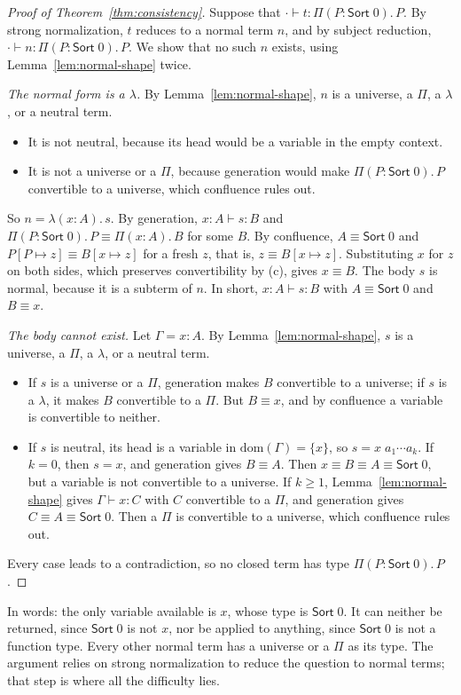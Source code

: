 \documentclass[acmsmall,screen,nonacm]{acmart}
\newcommand{\Sort}[1]{\mathsf{Sort}\;#1}
\newcommand{\tPi}[3]{\Pi(#1{:}#2).\,#3}
\newcommand{\tLam}[3]{\lambda(#1{:}#2).\,#3}
\newcommand{\subst}[3]{#1[#2 \mapsto #3]}
\newcommand{\dom}{\mathrm{dom}}
\newcommand{\conv}{\equiv}
\begin{document}
\begin{proof}[Proof of Theorem~\ref{thm:consistency}]
Suppose that $\cdot \vdash t : \tPi{P}{\Sort{0}}{P}$.
By strong normalization, $t$ reduces to a normal term $n$, and by subject reduction, $\cdot \vdash n : \tPi{P}{\Sort{0}}{P}$.
We show that no such $n$ exists, using Lemma~\ref{lem:normal-shape} twice.

\emph{The normal form is a $\lambda$.}
By Lemma~\ref{lem:normal-shape}, $n$ is a universe, a $\Pi$, a $\lambda$, or a neutral term.
\begin{itemize}
  \item It is not neutral, because its head would be a variable in the empty context.
  \item It is not a universe or a $\Pi$, because generation would make $\tPi{P}{\Sort{0}}{P}$ convertible to a universe, which confluence rules out.
\end{itemize}
So $n = \tLam{x}{A}{s}$.
By generation, $x : A \vdash s : B$ and $\tPi{P}{\Sort{0}}{P} \conv \tPi{x}{A}{B}$ for some $B$.
By confluence, $A \conv \Sort{0}$ and $\subst{P}{P}{z} \conv \subst{B}{x}{z}$ for a fresh $z$, that is, $z \conv \subst{B}{x}{z}$.
Substituting $x$ for $z$ on both sides, which preserves convertibility by (c), gives $x \conv B$.
The body $s$ is normal, because it is a subterm of $n$.
In short, $x : A \vdash s : B$ with $A \conv \Sort{0}$ and $B \conv x$.

\emph{The body cannot exist.}
Let $\Gamma = x : A$. By Lemma~\ref{lem:normal-shape}, $s$ is a universe, a $\Pi$, a $\lambda$, or a neutral term.
\begin{itemize}
  \item If $s$ is a universe or a $\Pi$, generation makes $B$ convertible to a universe; if $s$ is a $\lambda$, it makes $B$ convertible to a $\Pi$.
    But $B \conv x$, and by confluence a variable is convertible to neither.
  \item If $s$ is neutral, its head is a variable in $\dom(\Gamma) = \{x\}$, so $s = x\;a_1 \cdots a_k$.
    If $k = 0$, then $s = x$, and generation gives $B \conv A$. Then $x \conv B \conv A \conv \Sort{0}$, but a variable is not convertible to a universe.
    If $k \ge 1$, Lemma~\ref{lem:normal-shape} gives $\Gamma \vdash x : C$ with $C$ convertible to a $\Pi$, and generation gives $C \conv A \conv \Sort{0}$.
    Then a $\Pi$ is convertible to a universe, which confluence rules out.
\end{itemize}
Every case leads to a contradiction, so no closed term has type $\tPi{P}{\Sort{0}}{P}$.
\end{proof}

\noindent In words: the only variable available is $x$, whose type is $\Sort{0}$.
It can neither be returned, since $\Sort{0}$ is not $x$, nor be applied to anything, since $\Sort{0}$ is not a function type.
Every other normal term has a universe or a $\Pi$ as its type.
The argument relies on strong normalization to reduce the question to normal terms; that step is where all the difficulty lies.
\end{document}
